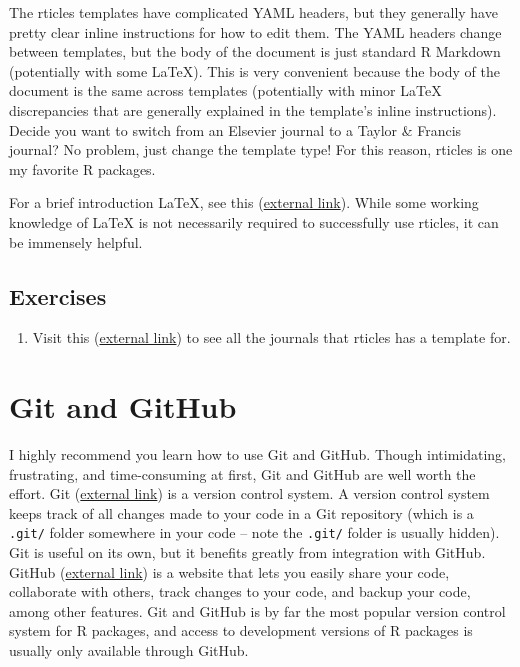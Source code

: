\documentclass[
]{book}
\providecommand{\tightlist}{%
  \setlength{\itemsep}{0pt}\setlength{\parskip}{0pt}}
\begin{document}
The rticles templates have complicated YAML headers, but they generally have pretty clear inline instructions for how to edit them. The YAML headers change between templates, but the body of the document is just standard R Markdown (potentially with some LaTeX). This is very convenient because the body of the document is the same across templates (potentially with minor LaTeX discrepancies that are generally explained in the template's inline instructions). Decide you want to switch from an Elsevier journal to a Taylor \& Francis journal? No problem, just change the template type! For this reason, rticles is one my favorite R packages.

For a brief introduction LaTeX, see this (\href{https://www.overleaf.com/learn/latex/Learn_LaTeX_in_30_minutes}{external link}). While some working knowledge of LaTeX is not necessarily required to successfully use rticles, it can be immensely helpful.

\hypertarget{ex-set13}{%
\subsection{Exercises}\label{ex-set13}}

\begin{enumerate}
\def\labelenumi{\arabic{enumi}.}
\tightlist
\item
  Visit this (\href{https://github.com/rstudio/rticles}{external link}) to see all the journals that rticles has a template for.
\end{enumerate}

\hypertarget{git-github}{%
\section{Git and GitHub}\label{git-github}}

I highly recommend you learn how to use Git and GitHub. Though intimidating, frustrating, and time-consuming at first, Git and GitHub are well worth the effort. Git (\href{https://git-scm.com/}{external link}) is a version control system. A version control system keeps track of all changes made to your code in a Git repository (which is a \texttt{.git/} folder somewhere in your code -- note the \texttt{.git/} folder is usually hidden). Git is useful on its own, but it benefits greatly from integration with GitHub. GitHub (\href{https://github.com/}{external link}) is a website that lets you easily share your code, collaborate with others, track changes to your code, and backup your code, among other features. Git and GitHub is by far the most popular version control system for R packages, and access to development versions of R packages is usually only available through GitHub.
\end{document}
